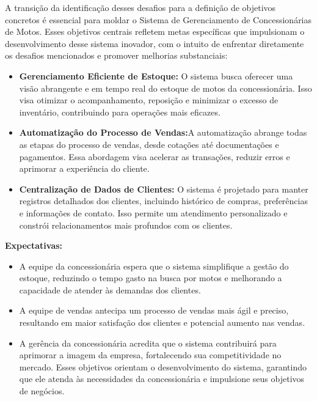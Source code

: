 A transição da identificação desses desafios para a definição de objetivos concretos é essencial para moldar o Sistema de Gerenciamento de Concessionárias de Motos. Esses objetivos centrais refletem metas específicas que impulsionam o desenvolvimento desse sistema inovador, com o intuito de enfrentar diretamente os desafios mencionados e promover melhorias substanciais:
\begin{itemize}
\item\textbf{Gerenciamento Eficiente de Estoque:} O sistema busca oferecer uma visão abrangente e em tempo real do estoque de motos da concessionária. Isso visa otimizar o acompanhamento, reposição e minimizar o excesso de inventário, contribuindo para operações mais eficazes.

\item\textbf{Automatização do Processo de Vendas:}A automatização abrange todas as etapas do processo de vendas, desde cotações até documentações e pagamentos. Essa abordagem visa acelerar as transações, reduzir erros e aprimorar a experiência do cliente.

\item\textbf{Centralização de Dados de Clientes:} O sistema é projetado para manter registros detalhados dos clientes, incluindo histórico de compras, preferências e informações de contato. Isso permite um atendimento personalizado e constrói relacionamentos mais profundos com os clientes.\\
\end{itemize}


\textbf{Expectativas:}
\begin{itemize}
	\item A equipe da concessionária espera que o sistema simplifique a gestão do estoque, reduzindo o tempo gasto na busca por motos e melhorando a capacidade de atender às demandas dos clientes.
	
	\item A equipe de vendas antecipa um processo de vendas mais ágil e preciso, resultando em maior satisfação dos clientes e potencial aumento nas vendas.
	
	\item A gerência da concessionária acredita que o sistema contribuirá para aprimorar a imagem da empresa, fortalecendo sua competitividade no mercado. Esses objetivos orientam o desenvolvimento do sistema, garantindo que ele atenda às necessidades da concessionária e impulsione seus objetivos de negócios.
\end{itemize}


